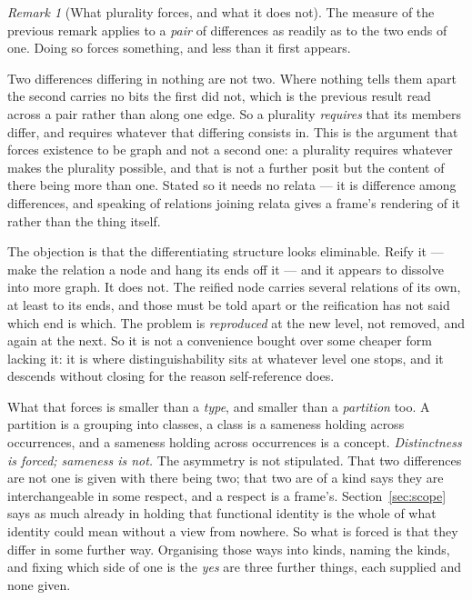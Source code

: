 \documentclass[11pt,a4paper]{article}
\theoremstyle{remark}\newtheorem{remark}[definition]{Remark}
\begin{document}
\begin{remark}[What plurality forces, and what it does not]\label{rem:types-forced}
The measure of the previous remark applies to a \emph{pair} of differences as readily as to the two
ends of one. Doing so forces something, and less than it first appears.

Two differences differing in nothing are not two. Where nothing tells them apart the second carries no
bits the first did not, which is the previous result read across a pair rather than along one edge. So
a plurality \emph{requires} that its members differ, and requires whatever that differing consists in.
This is the argument that forces existence to be graph and not a second one: a plurality requires
whatever makes the plurality possible, and that is not a further posit but the content of there being
more than one. Stated so it needs no relata --- it is difference among differences, and speaking of
relations joining relata gives a frame's rendering of it rather than the thing itself.

The objection is that the differentiating structure looks eliminable. Reify it --- make the relation a
node and hang its ends off it --- and it appears to dissolve into more graph. It does not. The reified
node carries several relations of its own, at least to its ends, and those must be told apart or the
reification has not said which end is which. The problem is \emph{reproduced} at the new level, not
removed, and again at the next. So it is not a convenience bought over some cheaper form lacking it: it
is where distinguishability sits at whatever level one stops, and it descends without closing for the
reason self-reference does.

What that forces is smaller than a \emph{type}, and smaller than a \emph{partition} too. A partition
is a grouping into classes, a class is a sameness holding across
occurrences, and a sameness holding across occurrences is a concept. \emph{Distinctness is forced;
sameness is not.} The asymmetry is not stipulated. That two differences are not one is given with there
being two; that two are of a kind says they are interchangeable in some respect, and a respect is a
frame's. Section~\ref{sec:scope} says as much already in holding that functional identity is the whole
of what identity could mean without a view from nowhere. So what is forced is that they differ in some
further way. Organising those ways into kinds, naming the kinds, and fixing which side of one is the
\emph{yes} are three further things, each supplied and none given.


\end{remark}
\end{document}
